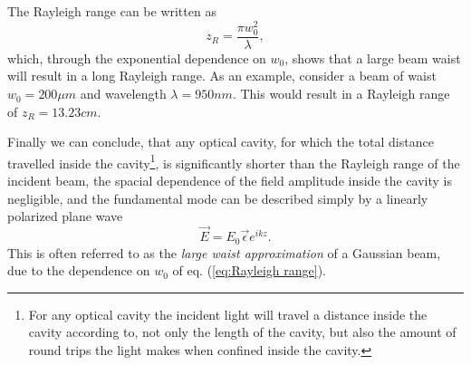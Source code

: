 The Rayleigh range can be written as \cite{Pedrotti}
\begin{equation}
    z_R = \frac{\pi w_0^2}{\lambda},
    \label{eq:Rayleigh range}
\end{equation}
which, through the exponential dependence on $w_0$, shows that a large beam waist will result in a long Rayleigh range. As an example, consider a beam of waist $w_0 = 200 \mu m$ and wavelength $\lambda = 950 nm$. This would result in a Rayleigh range of $z_R=13.23 cm$. 

Finally we can conclude, that any optical cavity, for which the total distance travelled inside the cavity\footnote{For any optical cavity the incident light will travel a distance inside the cavity according to, not only the length of the cavity, but also the amount of round trips the light makes when confined inside the cavity.}, is significantly shorter than the Rayleigh range of the incident beam, the spacial dependence of the field amplitude inside the cavity is negligible, and the fundamental mode can be described simply by a linearly polarized plane wave
\begin{equation}
    \vec{E} = E_0 \vec{\epsilon} e^{ikz}.
\end{equation}
This is often referred to as the \emph{large waist approximation} of a Gaussian beam, due to the dependence on $w_0$ of eq. (\ref{eq:Rayleigh range}).